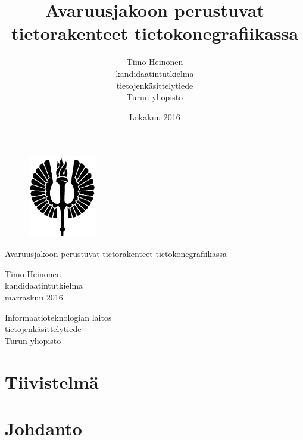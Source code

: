 \documentclass[a4paper,12pt, titlepage]{article}
\title{Avaruusjakoon perustuvat tietorakenteet tietokonegrafiikassa}
\author{Timo Heinonen \\kandidaatintutkielma \\ tietojenkäsittelytiede \\ Turun yliopisto}
\date{Lokakuu 2016}
\theoremstyle{break}
\begin{document}
\thispagestyle{empty}
\begin{figure}
\includegraphics[width=3cm]{img/soihtu.png}
\vspace{4.0cm}
\end{figure}


\begin{center}\Large
Avaruusjakoon perustuvat tietorakenteet tietokonegrafiikassa
\end{center}

\begin{center}
Timo Heinonen\\
kandidaatintutkielma\\
marraskuu 2016
\end{center}

\begin{center}
Informaatioteknologian laitos\\
tietojenkäsittelytiede\\
Turun yliopisto\\
\end{center}

\begin{figure}[b]
\vspace*{-5.0cm}
\end{figure}

\newpage
{}%
\thispagestyle{empty}
\section*{Tiivistelmä}
\newpage


\tableofcontents


\newpage
\section{Johdanto}
\end{document}
